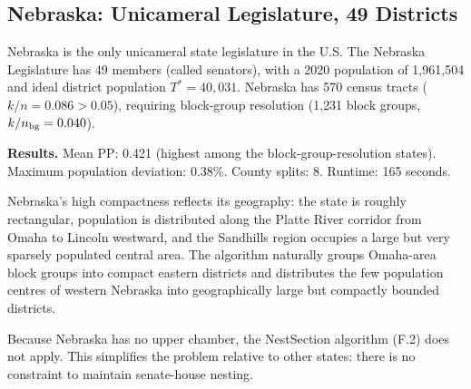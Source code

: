 \subsection{Nebraska: Unicameral Legislature, 49 Districts}
\label{sec:cases:ne}

Nebraska is the only unicameral state legislature in the U.S. The Nebraska
Legislature has 49 members (called senators), with a 2020 population of
1{,}961{,}504 and ideal district population $T^* = 40{,}031$.
Nebraska has 570 census tracts ($k/n = 0.086 > 0.05$), requiring block-group
resolution (1{,}231 block groups, $k/n_{\rm bg} = 0.040$).

\textbf{Results.} Mean PP: 0.421 (highest among the block-group-resolution states).
Maximum population deviation: 0.38\%. County splits: 8. Runtime: 165 seconds.

Nebraska's high compactness reflects its geography: the state is roughly
rectangular, population is distributed along the Platte River corridor from
Omaha to Lincoln westward, and the Sandhills region occupies a large but very
sparsely populated central area. The algorithm naturally groups Omaha-area
block groups into compact eastern districts and distributes the few population
centres of western Nebraska into geographically large but compactly bounded
districts.

Because Nebraska has no upper chamber, the NestSection algorithm (F.2) does
not apply. This simplifies the problem relative to other states: there is
no constraint to maintain senate-house nesting.
